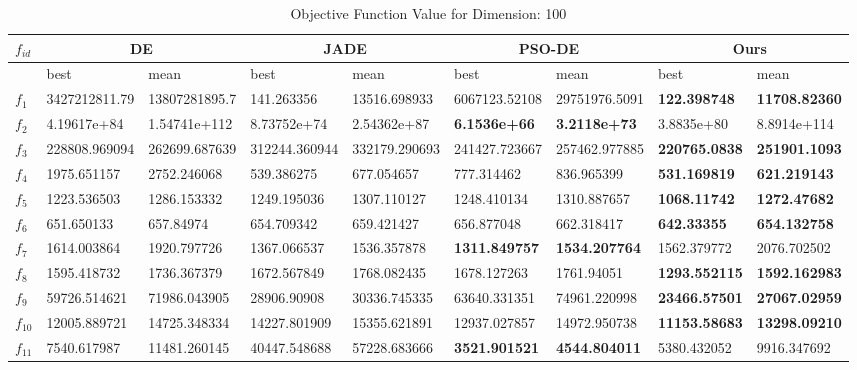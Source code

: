 \begin{table*}[h!]
\centering
\caption{Objective Function Value for Dimension: 100}
\vspace{-3mm}
 \begin{tabular}{|p{0.8cm}|p{1.6cm}|p{1.6cm}|p{1.6cm}|p{1.6cm}|p{1.6cm}|p{1.6cm}|p{1.6cm}|p{1.6cm}|} 
\hline
$f_{id}$ & \multicolumn{2}{c|}{DE} & \multicolumn{2}{c|}{JADE} & \multicolumn{2}{c|}{PSO-DE} & \multicolumn{2}{c|}{Ours} \\
\hline
    & best & mean & best & mean & best & mean & best & mean \\ [0.5ex] 
\hline
$f_{1}$  & 3427212811.79 & 13807281895.7 & 141.263356 & 13516.698933 & 6067123.52108 & 29751976.5091 & \textbf{122.398748} & \textbf{11708.82360} \\ 
$f_{2}$  & 4.19617e+84 & 1.54741e+112 & 8.73752e+74 & 2.54362e+87 & \textbf{6.1536e+66} & \textbf{3.2118e+73} & 3.8835e+80 & 8.8914e+114 \\ 
$f_{3}$  & 228808.969094 & 262699.687639 & 312244.360944 & 332179.290693 & 241427.723667 & 257462.977885 & \textbf{220765.0838} & \textbf{251901.1093} \\ 
$f_{4}$  & 1975.651157 & 2752.246068 & 539.386275 & 677.054657 & 777.314462 & 836.965399 & \textbf{531.169819} & \textbf{621.219143} \\ 
$f_{5}$  & 1223.536503 & 1286.153332 & 1249.195036 & 1307.110127 & 1248.410134 & 1310.887657 & \textbf{1068.11742} & \textbf{1272.47682} \\ 
$f_{6}$  & 651.650133 & 657.84974 & 654.709342 & 659.421427 & 656.877048 & 662.318417 & \textbf{642.33355} & \textbf{654.132758} \\ 
$f_{7}$  & 1614.003864 & 1920.797726 & 1367.066537 & 1536.357878 & \textbf{1311.849757} & \textbf{1534.207764} & 1562.379772 & 2076.702502 \\ 
$f_{8}$  & 1595.418732 & 1736.367379 & 1672.567849 & 1768.082435 & 1678.127263 & 1761.94051 & \textbf{1293.552115} & \textbf{1592.162983} \\ 
$f_{9}$  & 59726.514621 & 71986.043905 & 28906.90908 & 30336.745335 & 63640.331351 & 74961.220998 & \textbf{23466.57501} & \textbf{27067.02959} \\ 
$f_{10}$  & 12005.889721 & 14725.348334 & 14227.801909 & 15355.621891 & 12937.027857 & 14972.950738 & \textbf{11153.58683} & \textbf{13298.09210} \\ 
$f_{11}$  & 7540.617987 & 11481.260145 & 40447.548688 & 57228.683666 & \textbf{3521.901521} & \textbf{4544.804011} & 5380.432052 & 9916.347692 \\ 

\end{tabular}
\end{table*}
